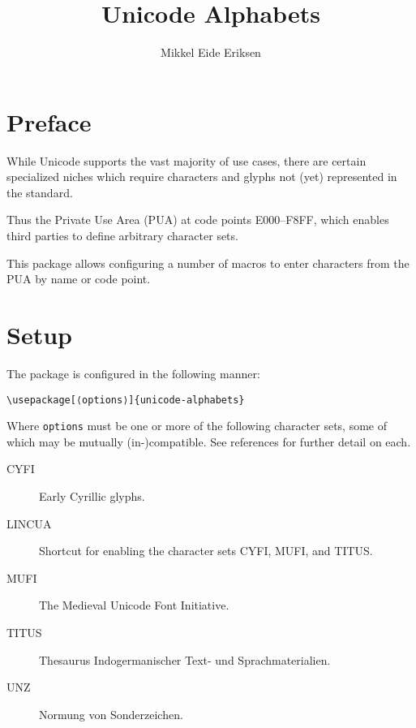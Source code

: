 \documentclass{article}
\title{Unicode Alphabets}
\author{Mikkel Eide Eriksen}
\begin{document}
\maketitle

\section{Preface}

While Unicode supports the vast majority of use cases, there are certain specialized niches which require characters and glyphs not (yet) represented in the standard.

Thus the Private Use Area (PUA) at code points E000--F8FF, which enables third parties to define arbitrary character sets.

This package allows configuring a number of macros to enter characters from the PUA by name or code point.

\section{Setup}

The package is configured in the following manner:

\begin{verbatim}
\usepackage[⟨options⟩]{unicode-alphabets}
\end{verbatim}

Where \verb|options| must be one or more of the following character sets, some of which may be mutually (in-)compatible. See references for further detail on each.

\begin{description}

\item[CYFI\cite{CYFI}] Early Cyrillic glyphs.
\item[LINCUA\cite{LINCUA}] Shortcut for enabling the character sets CYFI, MUFI, and TITUS.
\item[MUFI\cite{MUFI}] The Medieval Unicode Font Initiative.
\item[TITUS\cite{TITUS}] Thesaurus Indogermanischer Text- und Sprachmaterialien.
\item[UNZ\cite{UNZ}] Normung von Sonderzeichen.

\end{description}
\end{document}
